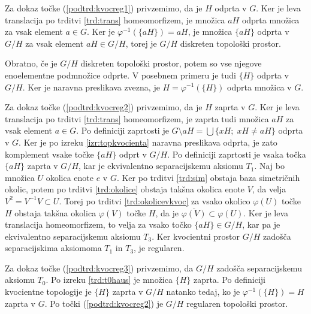 \documentclass[mat1]{fmfdelo}
\newcommand{\closure}[1]{\overline{#1}}
\begin{document}
\begin{dokaz}
Za dokaz točke (\ref{podtrd:kvocreg1}) privzemimo, da je $H$ odprta v $G$. Ker je leva translacija po trditvi \ref{trd:trans} homeomorfizem, je množica $aH$ odprta množica za vsak element $a \in G$. Ker je $\varphi^{-1}(\lbrace aH \rbrace) = aH$, je množica $\lbrace aH \rbrace$ odprta v $G/H$ za vsak element $aH \in G/H$, torej je $G/H$ diskreten topološki prostor.

Obratno, če je $G/H$ diskreten topološki prostor, potem so vse njegove eno\-e\-le\-ment\-ne podmnožice odprte. V posebnem primeru je tudi $\lbrace H \rbrace$ odprta v $G/H$. Ker je naravna preslikava zvezna, je $H = \varphi^{-1}(\lbrace H \rbrace)$ odprta množica v $G$.

Za dokaz točke (\ref{podtrd:kvocreg2}) privzemimo, da je $H$ zaprta v $G$. Ker je leva translacija po trditvi \ref{trd:trans} homeomorfizem, je zaprta tudi množica $aH$ za vsak element $a \in G$. Po definiciji zaprtosti je $G\setminus aH = \bigcup \lbrace xH ;\; xH \neq aH \rbrace$ odprta v $G$. Ker je po izreku \ref{izr:topkvocienta} naravna preslikava odprta, je zato komplement vsake točke $\lbrace aH \rbrace$ odprt v $G/H$. Po definiciji zaprtosti je vsaka točka $\lbrace aH \rbrace$ zaprta v $G/H$, kar je ekvivalentno separacijskemu aksiomu $T_1$. 
Naj bo množica $U$ okolica enote $e$ v $G$. Ker po trditvi \ref{trd:sim} obstaja baza simetričnih okolic, potem po trditvi \ref{trd:okolice} obstaja takšna okolica enote $V$, da velja $V^2 = V^{-1}V \subset U$. Torej po trditvi \ref{trd:okolicevkvoc} za vsako okolico $\varphi(U)$ točke $H$ obstaja takšna okolica $\varphi(V)$ točke $H$, da je $\closure{\varphi(V)} \subset \varphi(U)$.
Ker je leva translacija homeomorfizem, to velja za vsako točko $\lbrace aH \rbrace \in G/H$, kar pa je ekvivalentno separacijskemu aksiomu $T_3$. Ker kvocientni prostor $G/H$ zadošča separacijskima aksiomoma $T_1$ in $T_3$, je regularen.

Za dokaz točke (\ref{podtrd:kvocreg3}) privzemimo, da $G/H$ zadošča separacijskemu aksiomu $T_0$. Po izreku \ref{trd:t0haus} je množica $\lbrace H \rbrace$ zaprta. Po definiciji kvocientne topologije je $\lbrace H \rbrace$ zaprta v $G/H$ natanko tedaj, ko je $\varphi^{-1}(\lbrace H \rbrace) = H$ zaprta v $G$. Po točki (\ref{podtrd:kvocreg2}) je $G/H$ regularen topološki prostor.
\end{dokaz}
\end{document}
